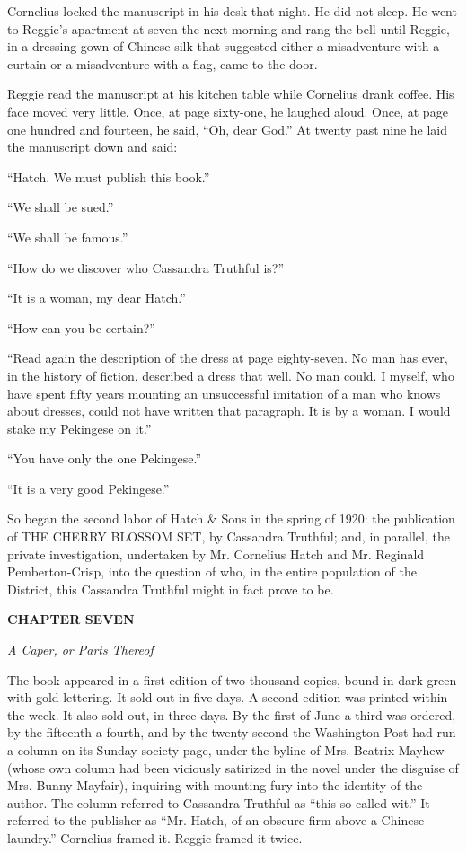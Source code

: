 \documentclass[12pt,openright]{book}
\begin{document}
Cornelius locked the manuscript in his desk that night. He did not sleep. He went to Reggie’s apartment at seven the next morning and rang the bell until Reggie, in a dressing gown of Chinese silk that suggested either a misadventure with a curtain or a misadventure with a flag, came to the door.

Reggie read the manuscript at his kitchen table while Cornelius drank coffee. His face moved very little. Once, at page sixty-one, he laughed aloud. Once, at page one hundred and fourteen, he said, “Oh, dear God.” At twenty past nine he laid the manuscript down and said:

“Hatch. We must publish this book.”

“We shall be sued.”

“We shall be famous.”

“How do we discover who Cassandra Truthful is?”

“It is a woman, my dear Hatch.”

“How can you be certain?”

“Read again the description of the dress at page eighty-seven. No man has ever, in the history of fiction, described a dress that well. No man could. I myself, who have spent fifty years mounting an unsuccessful imitation of a man who knows about dresses, could not have written that paragraph. It is by a woman. I would stake my Pekingese on it.”

“You have only the one Pekingese.”

“It is a very good Pekingese.”

So began the second labor of Hatch \& Sons in the spring of 1920: the publication of THE CHERRY BLOSSOM SET, by Cassandra Truthful; and, in parallel, the private investigation, undertaken by Mr. Cornelius Hatch and Mr. Reginald Pemberton-Crisp, into the question of who, in the entire population of the District, this Cassandra Truthful might in fact prove to be.

\textbf{CHAPTER SEVEN}

\textit{A Caper, or Parts Thereof}

The book appeared in a first edition of two thousand copies, bound in dark green with gold lettering. It sold out in five days. A second edition was printed within the week. It also sold out, in three days. By the first of June a third was ordered, by the fifteenth a fourth, and by the twenty-second the Washington Post had run a column on its Sunday society page, under the byline of Mrs. Beatrix Mayhew (whose own column had been viciously satirized in the novel under the disguise of Mrs. Bunny Mayfair), inquiring with mounting fury into the identity of the author. The column referred to Cassandra Truthful as “this so-called wit.” It referred to the publisher as “Mr. Hatch, of an obscure firm above a Chinese laundry.” Cornelius framed it. Reggie framed it twice.
\end{document}
